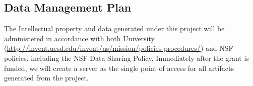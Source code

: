 \subsection*{Data Management Plan}

The Intellectual property and data generated under this project will
be administered in accordance with both University (\url{http://invent.ucsd.edu/invent/us/mission/policies-procedures/}) and NSF policies,
including the NSF Data Sharing Policy. Immediately after the grant is
funded, we will create a server as the single point of access for all
artifacts generated from the project.
\begin{packed_enum}
\item 
\item 
\end{packed_enum}




